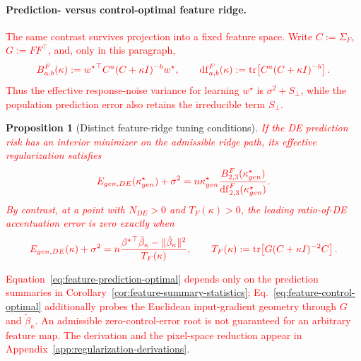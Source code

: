 \documentclass{article}
\newcommand{\red}[1]{\textcolor{red}{#1}}
\providecommand{\propositionname}{Proposition}
\theoremstyle{plain}
\newtheorem{prop}[thm]{\propositionname}
\theoremstyle{definition}
\theoremstyle{remark}
\begin{document}
\paragraph{Prediction- versus control-optimal feature ridge.}
\red{The same contrast survives projection into a fixed feature space. Write $C:=\Sigma_F$, $G:=FF^\top$, and, only in this paragraph,}
\begin{equation}
\color{red}
B^F_{a,b}(\kappa):={w^\star}^\top C^a(C+\kappa I)^{-b}w^\star,
\qquad
\mathrm{df}^F_{a,b}(\kappa):=\operatorname{tr}\!\left[C^a(C+\kappa I)^{-b}\right].
\label{eq:feature-spectral-shorthand}
\end{equation}
\red{Thus the effective response-noise variance for learning $w^\star$ is $\sigma^2+S_\perp$, while the population prediction error also retains the irreducible term $S_\perp$.}
\begin{prop}[Distinct feature-ridge tuning conditions]\label{prop:feature-ridge-tuning}
\red{If the DE prediction risk has an interior minimizer on the admissible ridge path, its effective regularization satisfies}
\begin{equation}
\color{red}
E_{gen,DE}(\kappa_{gen}^\star)+\sigma^2
=n\kappa_{gen}^\star
\frac{B^F_{2,3}(\kappa_{gen}^\star)}{\mathrm{df}^F_{2,3}(\kappa_{gen}^\star)}.
\label{eq:feature-prediction-optimal}
\end{equation}
\red{By contrast, at a point with $N_{DE}>0$ and $T_F(\kappa)>0$, the leading ratio-of-DE accentuation error is zero exactly when}
\begin{equation}
\color{red}
E_{gen,DE}(\kappa)+\sigma^2
=n\frac{{{\beta^{\star}}}^\top\tilde\beta_\kappa-\|\tilde\beta_\kappa\|^2}{T_F(\kappa)},
\qquad
T_F(\kappa):=\operatorname{tr}\!\left[G(C+\kappa I)^{-2}C\right].
\label{eq:feature-control-optimal}
\end{equation}
\end{prop}
\red{Equation~\ref{eq:feature-prediction-optimal} depends only on the prediction summaries in Corollary~\ref{cor:feature-summary-statistics}; Eq.~\ref{eq:feature-control-optimal} additionally probes the Euclidean input-gradient geometry through $G$ and $\tilde\beta_\kappa$. An admissible zero-control-error root is not guaranteed for an arbitrary feature map. The derivation and the pixel-space reduction appear in Appendix~\ref{app:regularization-derivations}.}
\end{document}
